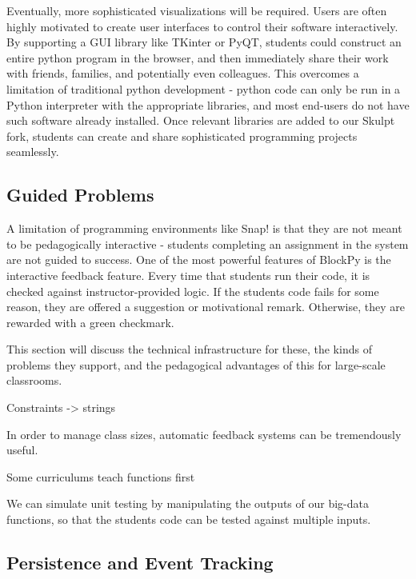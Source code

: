 \documentclass{sig-alternate}
\begin{document}
Eventually, more sophisticated visualizations will be required.
Users are often highly motivated to create user interfaces to control their software interactively.
By supporting a GUI library like TKinter or PyQT, students could construct an entire python program in the browser, and then immediately share their work with friends, families, and potentially even colleagues.
This overcomes a limitation of traditional python development - python code can only be run in a Python interpreter with the appropriate libraries, and most end-users do not have such software already installed.
Once relevant libraries are added to our Skulpt fork, students can create and share sophisticated programming projects seamlessly.
	
\subsection{Guided Problems}

A limitation of programming environments like Snap! is that they are not meant to be pedagogically interactive - students completing an assignment in the system are not guided to success.
One of the most powerful features of BlockPy is the interactive feedback feature. Every time that students run their code, it is checked against instructor-provided logic.
If the students code fails for some reason, they are offered a suggestion or motivational remark.
Otherwise, they are rewarded with a green checkmark.

This section will discuss the technical infrastructure for these, the kinds of problems they support, and the pedagogical advantages of this for large-scale classrooms.

	Constraints -> strings
	
	In order to manage class sizes, automatic feedback systems can be tremendously useful.
	
	Some curriculums teach functions first
	
	We can simulate unit testing by manipulating the outputs of our big-data functions, so that the students code can
 be tested against multiple inputs.
	
\subsection{Persistence and Event Tracking}
\end{document}
